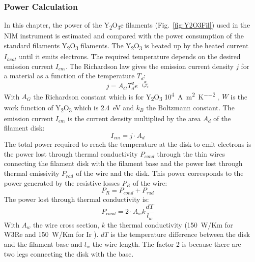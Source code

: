 		\subsubsection{Power Calculation }
		In this chapter, the power of the Y\textsubscript{2}O\textsubscript{3}e filaments (Fig.~\ref{fig:Y2O3Fil}) used in the NIM instrument is estimated and compared with the power consumption of the standard filaments Y\textsubscript{2}O\textsubscript{3} filaments.
		The Y\textsubscript{2}O\textsubscript{3} is heated up by the heated current $I_{heat}$ until it emits electrons. The required temperature depends on the desired emission current $I_{em}$. The Richardson law gives the emission current density $j$ for a material as a function of the temperature $T_d$:
		\begin{equation}
			j = A_GT_d^2e^{-\frac{W}{k_bT_d}}
			\label{eq:Richardson}
		\end{equation} %
		With $A_G$ the Richardson constant which is for Y\textsubscript{2}O\textsubscript{3} 10\textsuperscript{4}~\si{\ampere\per\square\meter\per\square\kelvin} \cite{MaterHandbookCardaelli}, $W$ is the work function of Y\textsubscript{2}O\textsubscript{3} which is 2.4~eV \cite{MaterHandbookCardaelli} and $k_B$ the Boltzmann constant. The emission current $I_{em}$ is the current density multiplied by the area $A_{d}$ of the filament disk:
		\begin{equation}
			I_{em} = j\cdot A_{d}
		\end{equation}
		The total power required to reach the temperature at the disk to emit electrons is the power lost through thermal conductivity $P_{cond}$ through the thin wires connecting the filament disk with the filament base and the power lost through thermal emissivity $P_{rad}$ of the wire and the disk. This power corresponds to the power generated by the resistive losses $P_{R}$ of the wire:
		\begin{equation}
			P_{R} = P_{cond} + P_{rad}
		\end{equation}
		The power lost through thermal conductivity is:
		\begin{equation}
			P_{cond} = 2\cdot A_{w}k\frac{dT}{l_{w}}
		\end{equation}
		With $A_{w}$ the wire cross section, $k$ the thermal conductivity (150~W/Km for W3Re \cite{thermcondTungst} and 150~W/Km for Ir \cite{Ho_1972}). $dT$ is the temperature difference between the disk and the filament base and $l_{w}$ the wire length. The factor 2 is because there are two legs connecting the disk with the base. %
